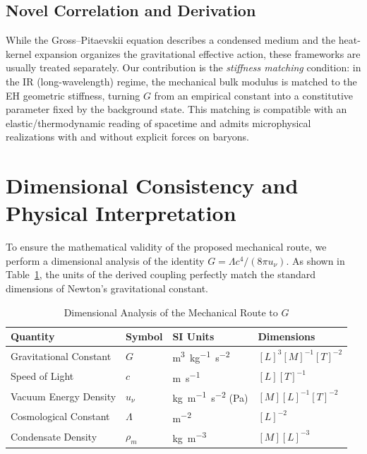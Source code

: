 \documentclass[11pt,a4paper]{article}
\begin{document}
\subsection{Novel Correlation and Derivation}
While the Gross--Pitaevskii equation describes a condensed medium and the heat-kernel expansion organizes the gravitational effective action, these frameworks are usually treated separately. Our contribution is the \emph{stiffness matching} condition: in the IR (long-wavelength) regime, the mechanical bulk modulus is matched to the EH geometric stiffness, turning $G$ from an empirical constant into a constitutive parameter fixed by the background state. This matching is compatible with an elastic/thermodynamic reading of spacetime and admits microphysical realizations with and without explicit forces on baryons.

\section{Dimensional Consistency and Physical Interpretation}
To ensure the mathematical validity of the proposed mechanical route, we perform a dimensional analysis of the identity $G = \Lambda c^4 / (8\pi u_\nu)$. As shown in Table~\ref{tab:dimensions}, the units of the derived coupling perfectly match the standard dimensions of Newton's gravitational constant.

\begin{table}[h]
\centering
\caption{Dimensional Analysis of the Mechanical Route to $G$}
\label{tab:dimensions}
\vspace{2mm}
\begin{tabular}{@{}llll@{}}
\toprule
\textbf{Quantity} & \textbf{Symbol} & \textbf{SI Units} & \textbf{Dimensions} \\ \midrule
Gravitational Constant & $G$ & \si{m^3.kg^{-1}.s^{-2}} & $[L]^3 [M]^{-1} [T]^{-2}$ \\
Speed of Light & $c$ & \si{m.s^{-1}} & $[L] [T]^{-1}$ \\
Vacuum Energy Density & $u_\nu$ & \si{kg.m^{-1}.s^{-2}} (Pa) & $[M] [L]^{-1} [T]^{-2}$ \\
Cosmological Constant & $\Lambda$ & \si{m^{-2}} & $[L]^{-2}$ \\
Condensate Density & $\rho_m$ & \si{kg.m^{-3}} & $[M] [L]^{-3}$ \\ \bottomrule
\end{tabular}
\end{table}
\end{document}
